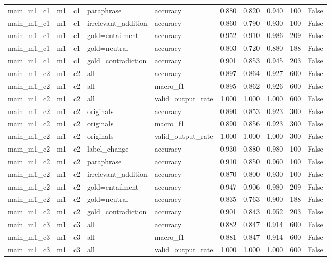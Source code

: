 \begin{tabular}{llllllllll}
main\_m1\_c1 & m1 & c1 & paraphrase & accuracy & 0.880 & 0.820 & 0.940 & 100 & False \\
main\_m1\_c1 & m1 & c1 & irrelevant\_addition & accuracy & 0.860 & 0.790 & 0.930 & 100 & False \\
main\_m1\_c1 & m1 & c1 & gold=entailment & accuracy & 0.952 & 0.910 & 0.986 & 209 & False \\
main\_m1\_c1 & m1 & c1 & gold=neutral & accuracy & 0.803 & 0.720 & 0.880 & 188 & False \\
main\_m1\_c1 & m1 & c1 & gold=contradiction & accuracy & 0.901 & 0.853 & 0.945 & 203 & False \\
main\_m1\_c2 & m1 & c2 & all & accuracy & 0.897 & 0.864 & 0.927 & 600 & False \\
main\_m1\_c2 & m1 & c2 & all & macro\_f1 & 0.895 & 0.862 & 0.926 & 600 & False \\
main\_m1\_c2 & m1 & c2 & all & valid\_output\_rate & 1.000 & 1.000 & 1.000 & 600 & False \\
main\_m1\_c2 & m1 & c2 & originals & accuracy & 0.890 & 0.853 & 0.923 & 300 & False \\
main\_m1\_c2 & m1 & c2 & originals & macro\_f1 & 0.890 & 0.856 & 0.923 & 300 & False \\
main\_m1\_c2 & m1 & c2 & originals & valid\_output\_rate & 1.000 & 1.000 & 1.000 & 300 & False \\
main\_m1\_c2 & m1 & c2 & label\_change & accuracy & 0.930 & 0.880 & 0.980 & 100 & False \\
main\_m1\_c2 & m1 & c2 & paraphrase & accuracy & 0.910 & 0.850 & 0.960 & 100 & False \\
main\_m1\_c2 & m1 & c2 & irrelevant\_addition & accuracy & 0.870 & 0.800 & 0.930 & 100 & False \\
main\_m1\_c2 & m1 & c2 & gold=entailment & accuracy & 0.947 & 0.906 & 0.980 & 209 & False \\
main\_m1\_c2 & m1 & c2 & gold=neutral & accuracy & 0.835 & 0.763 & 0.900 & 188 & False \\
main\_m1\_c2 & m1 & c2 & gold=contradiction & accuracy & 0.901 & 0.843 & 0.952 & 203 & False \\
main\_m1\_c3 & m1 & c3 & all & accuracy & 0.882 & 0.847 & 0.914 & 600 & False \\
main\_m1\_c3 & m1 & c3 & all & macro\_f1 & 0.881 & 0.847 & 0.914 & 600 & False \\
main\_m1\_c3 & m1 & c3 & all & valid\_output\_rate & 1.000 & 1.000 & 1.000 & 600 & False \\

\end{tabular}

